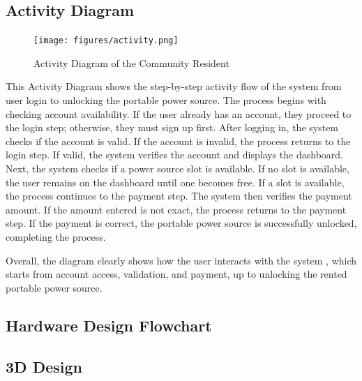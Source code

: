 { \subsection{Activity Diagram}
  \begin{figure}[H]
 	\centering
 	\caption{Activity Diagram of the Community Resident}
 	\label{fig:activity}
 	\texttt{[image: figures/activity.png]}
 \end{figure}
 
 This Activity Diagram shows the step-by-step activity flow of the system from user login to unlocking the portable power source. The process begins with checking account availability. If the user already has an account, they proceed to the login step; otherwise, they must sign up first. After logging in, the system checks if the account is valid. If the account is invalid, the process returns to the login step. If valid, the system verifies the account and displays the dashboard. Next, the system checks if a power source slot is available. If no slot is available, the user remains on the dashboard until one becomes free. If a slot is available, the process continues to the payment step. The system then verifies the payment amount. If the amount entered is not exact, the process returns to the payment step. If the payment is correct, the portable power source is successfully unlocked, completing the process.
 
 Overall, the diagram clearly shows how the user interacts with the system , which starts from account access, validation, and payment, up to unlocking the rented portable power source.
 
  \subsection{Hardware Design Flowchart}
  
  
   
  \subsection{3D Design}
  
}
